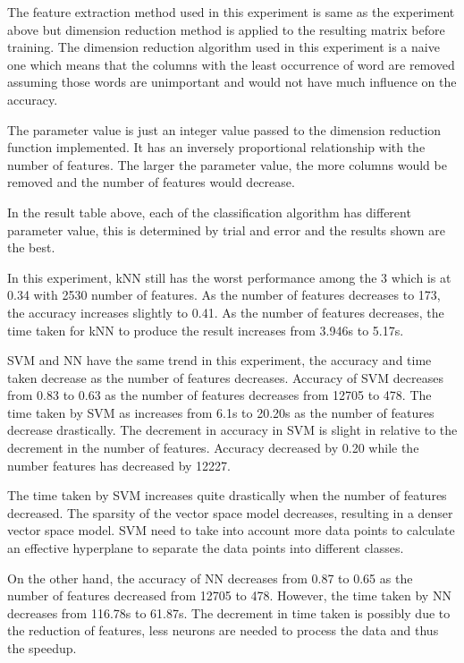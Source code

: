 The feature extraction method used in this experiment is same as the experiment above but dimension reduction method is applied to the resulting matrix before training. The dimension reduction algorithm used in this experiment is a naive one which means that the columns with the least occurrence of word are removed assuming those words are unimportant and would not have much influence on the accuracy.

The parameter value is just an integer value passed to the dimension reduction function implemented. It has an inversely proportional relationship with the number of features. The larger the parameter value, the more columns would be removed and the number of features would decrease.

In the result table above, each of the classification algorithm has different parameter value, this is determined by trial and error and the results shown are the best.

In this experiment, kNN still has the worst performance among the 3 which is at 0.34 with 2530 number of features. As the number of features decreases to 173, the accuracy increases slightly to 0.41. As the number of features decreases, the time taken for kNN to produce the result increases from 3.946s to 5.17s.

SVM and NN have the same trend in this experiment, the accuracy and time taken decrease as the number of features decreases. Accuracy of SVM decreases from 0.83 to 0.63 as the number of features decreases from 12705 to 478. The time taken by SVM as increases from 6.1s to 20.20s as the number of features decrease drastically. The decrement in accuracy in SVM is slight in relative to the decrement in the number of features. Accuracy decreased by 0.20 while the number features has decreased by 12227.

The time taken by SVM increases quite drastically when the number of features decreased. The sparsity of the vector space model decreases, resulting in a denser vector space model. SVM need to take into account more data points to calculate an effective hyperplane to separate the data points into different classes.

On the other hand, the accuracy of NN decreases from 0.87 to 0.65 as the number of features decreased from 12705 to 478. However, the time taken by NN decreases from 116.78s to 61.87s. The decrement in time taken is possibly due to the reduction of features, less neurons are needed to process the data and thus the speedup.

